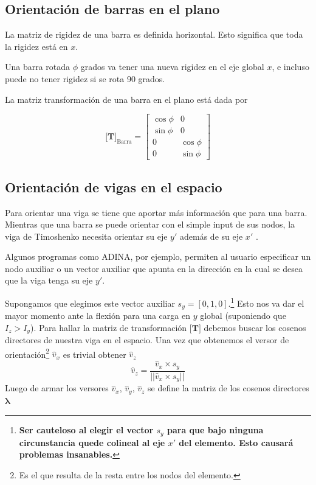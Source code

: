 \documentclass[11pt, a4paper,titlepage]{article}
\newcommand{\Adina}{{\sc ADINA}}
\newcommand{\Mme}[1]{\boldsymbol{[}\mathbf{#1} \boldsymbol{]}}
\begin{document}
\subsection*{Orientación de barras en el plano} \label{sec:OrientacionBarras}
La matriz de rigidez de una barra es definida horizontal. Esto significa que toda la rigidez está en $x$.

Una barra rotada $\phi$ grados va tener una nueva rigidez en el eje global $x$, e incluso puede no tener rigidez si se rota 90 grados.

La matriz transformación de una barra en el plano está dada por 

\[
\Mme{T}_{\mathrm{Barra}}= \begin{bmatrix}
\cos \phi & 0 \\
\sin \phi & 0 \\
0 & \cos \phi \\
0 & \sin \phi
\end{bmatrix}
\]

\subsection*{Orientación de vigas en el espacio}
Para orientar una viga se tiene que aportar más información que para una barra. Mientras que una barra se puede orientar con el simple input de sus nodos, la viga de Timoshenko necesita orientar su eje $y'$ además de su eje $x'$ .

Algunos programas como \Adina, por ejemplo, permiten al usuario especificar un nodo auxiliar o un vector auxiliar que apunta en la dirección en la cual se desea que la viga tenga su eje $y'$. 

Supongamos que elegimos este vector auxiliar $s_y=[0,1,0]$.\footnote{\textbf{Ser cauteloso al elegir el vector $s_y$ para que bajo ninguna circunstancia quede colineal al eje $x'$ del elemento. Esto causará problemas insanables.}} Esto nos va dar el mayor momento ante la flexión para una carga en $y$ global (suponiendo que $I_z>I_y$).
 \newcommand{\versor}[1]{\hat{#1}}
Para hallar la matriz de transformación $\Mme{T}$ debemos buscar los cosenos directores de nuestra viga en el espacio. Una vez que obtenemos el versor de orientación\footnote{Es el que resulta de la resta entre los nodos del elemento.} $\versor{v}_x$ es trivial obtener $\versor{v}_z$
\[
\versor{v}_z = \frac{\versor{v}_x\times s_y}{||\versor{v}_x\times s_y||}
\]
Luego de armar los versores $\versor{v}_x$, $\versor{v}_y$, $\versor{v}_z$ se define la matriz de los cosenos directores $\pmb{\lambda}$
\end{document}
